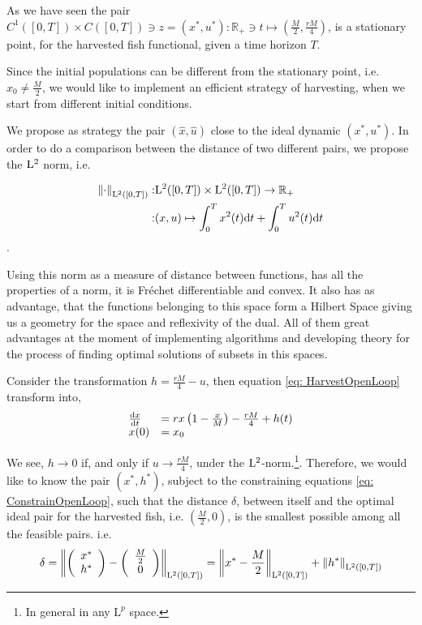 As we have seen the pair $C^1([0,T])\times C([0,T]) \ni z=(x^*,u^*): \mathbb{R_+}\ni t \mapsto \left(\frac{M}{2}, \frac{rM}{4}\right)$, is a stationary point, for the harvested fish functional, given a time horizon $T$. 

Since the initial populations can be different from the stationary point, i.e. $x_0\neq\frac{M}{2}$, we would like to implement an efficient strategy of harvesting, when we start from different initial conditions.

We propose as strategy the pair $(\hat{x}, \hat{u})$ close to the ideal dynamic $(x^*, u^*)$. In order to do a comparison between the distance of two different pairs, we propose the $\mathrm{L}^2$ norm, i.e. 

\begin{align}
	\left\lVert \cdot \right\rVert_{\mathrm{L}^2([0,T])}:& \mathrm{L}^2([0,T])\times \mathrm{L}^2([0,T])\rightarrow \mathbb{R_+}\\
	:& (x, u)\mapsto \int_{0}^T x^2(t)\mathrm{d} t +\int_{0}^T u^2(t)\mathrm{d} t	
\end{align}. 

Using this norm as a measure of distance between functions, has all the properties of a norm, it is Fr\'echet differentiable and convex. It also has as advantage, that the functions belonging to this space form a Hilbert Space giving us a geometry for the space and reflexivity of the dual. All of them great advantages at the moment of implementing algorithms and developing theory for the process of finding optimal solutions of subsets in this spaces.


Consider the transformation $h=\frac{rM}{4}-u$, then equation \ref{eq: HarvestOpenLoop} transform into,
\begin{align}
\begin{array}{ll}
	\frac{\mathrm{d} x}{{\mathrm{d} t}}&=rx\left(1-\frac{x}{M}\right)-\frac{rM}{4}+h(t) \\
	x(0)&=x_0
\end{array}
 \label{eq: ConstrainOpenLoop}
\end{align}

We see, $h \rightarrow 0$ if, and only if $u\rightarrow \frac{rM}{4}$, under the $\mathrm{L}^2$-norm.\footnote{In general in any $\mathrm{L}^p$ space.}.  Therefore, we would like to know the pair $(x^*, h^*)$, subject to the constraining equations \ref{eq: ConstrainOpenLoop}, such that the distance $\delta$, between itself and the optimal ideal pair for the harvested fish, i.e. $\left(\frac{M}{2}, 0\right)$, is the smallest possible among all the feasible pairs. i.e. 
\begin{equation}
\delta=	\left\lVert \left(\begin{array}{c}
			x^* \\ h^*
		\end{array}\right)-\left(\begin{array}{c} \frac{M}{2}\\ 0\end{array}\right) \right\rVert_{\mathrm{L}^2([0,T])}=\left\lVert x^*-\frac{M}{2} \right\rVert_{\mathrm{L}^2([0,T])}+\left\lVert h^* \right\rVert_{\mathrm{L}^2([0,T])}
\end{equation}

